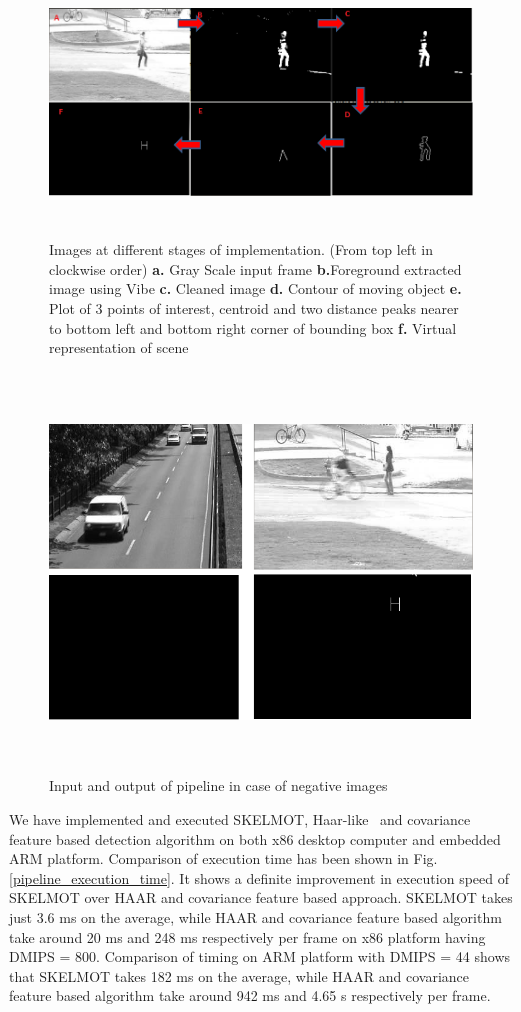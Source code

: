 \begin{figure}[!t]
\centering
\includegraphics[height=200pt]{Figures/pipeline_images}
\caption{Images at different stages of implementation. (From top left in
clockwise order) \textbf{a.} Gray Scale input frame
\textbf{b.}Foreground extracted image using Vibe \textbf{c.} Cleaned
image \textbf{d.} Contour of moving object \textbf{e.} Plot of 3 points
of interest, centroid and two distance peaks nearer to bottom left and
bottom right corner of bounding box \textbf{f.} Virtual representation
of scene} 
\label{pipeline_images}
\end{figure}
\begin{figure}[!b]
\centering
\includegraphics[height=300pt]{Figures/negative_inputs}
\caption{Input and output of pipeline in case of negative images}
\label{negative_inputs}
\end{figure}

\indent We have implemented and executed SKELMOT, Haar-like~\cite{19} and
covariance~\cite{19} feature based detection algorithm on both x86
desktop computer and embedded ARM platform. Comparison of execution time
has been shown in Fig.\ref{pipeline_execution_time}. It shows a
definite improvement in execution speed of SKELMOT over HAAR and covariance
feature based approach.  SKELMOT takes just 3.6 ms on the average, while
HAAR and covariance feature based algorithm take around 20 ms and 248 ms
respectively per frame on x86 platform having DMIPS = 800. Comparison of
timing on ARM platform with DMIPS = 44 shows that SKELMOT takes 182 ms
on the average, while HAAR and covariance feature based algorithm take
around 942 ms and 4.65 s respectively per frame.

